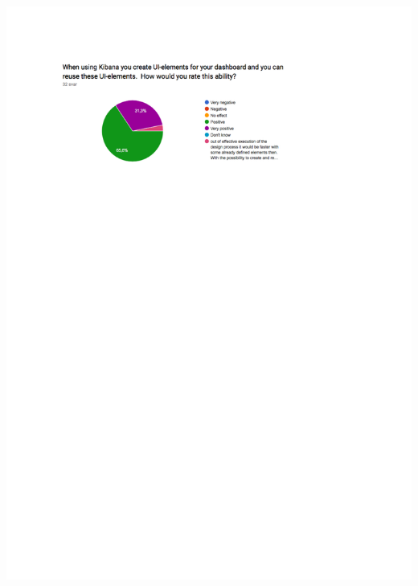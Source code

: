 \documentclass[12pt]{kththesis}
\begin{document}
\begin{appendices}
\includegraphics[width=1\textwidth]{UtvarderingSvar4}

\afterpage{\null\newpage}
\end{appendices}



\end{document}
